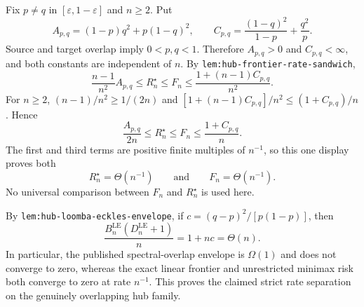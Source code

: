 Fix \(p\ne q\) in \([\varepsilon,1-\varepsilon]\) and \(n\ge2\).  Put
\[
 A_{p,q}=(1-p)q^2+p(1-q)^2,
 \qquad
 C_{p,q}=\frac{(1-q)^2}{1-p}+\frac{q^2}{p}.
\]
Source and target overlap imply \(0<p,q<1\).  Therefore \(A_{p,q}>0\) and \(C_{p,q}<\infty\), and both constants are independent of \(n\).  By \texttt{lem:hub-frontier-rate-sandwich},
\[
 \frac{n-1}{n^2}A_{p,q}
 \le R_n^{\star}\le F_n
 \le\frac{1+(n-1)C_{p,q}}{n^2}.
\]
For \(n\ge2\), \((n-1)/n^2\ge1/(2n)\) and
\(
 [1+(n-1)C_{p,q}]/n^2\le(1+C_{p,q})/n
\).  Hence
\[
 \frac{A_{p,q}}{2n}
 \le R_n^{\star}\le F_n
 \le\frac{1+C_{p,q}}{n}.
\]
The first and third terms are positive finite multiples of \(n^{-1}\), so this one display proves both
\[
 R_n^{\star}=\Theta(n^{-1})
 \qquad\text{and}\qquad
 F_n=\Theta(n^{-1}).
\]
No universal comparison between \(F_n\) and \(R_n^{\star}\) is used here.

By \texttt{lem:hub-loomba-eckles-envelope}, if
\(
 c=(q-p)^2/[p(1-p)]
\), then
\[
 \frac{B_n^{\mathrm{LE}}(D_n^{\mathrm{LE}}+1)}{n}
 =1+nc=\Theta(n).
\]
In particular, the published spectral-overlap envelope is \(\Omega(1)\) and does not converge to zero, whereas the exact linear frontier and unrestricted minimax risk both converge to zero at rate \(n^{-1}\).  This proves the claimed strict rate separation on the genuinely overlapping hub family.
